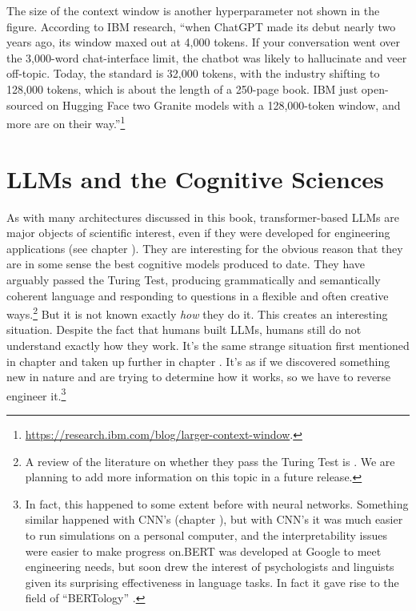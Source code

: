The size of the context window is another hyperparameter not shown in the
figure. According to IBM research, ``when ChatGPT made its debut nearly two
years ago, its window maxed out at 4,000 tokens. If your conversation went over
the 3,000-word chat-interface limit, the chatbot was likely to hallucinate and
veer off-topic. Today, the standard is 32,000 tokens, with the industry
shifting to 128,000 tokens, which is about the length of a 250-page book. IBM
just open-sourced on Hugging Face two Granite models with a 128,000-token
window, and more are on their
way.''\footnote{\url{https://research.ibm.com/blog/larger-context-window}.}

\section{LLMs and the Cognitive Sciences}\label{llm_cogsci}

As with many architectures discussed in this book, transformer-based LLMs are
major objects of scientific interest, even if they were developed for
engineering applications (see chapter ). They are
interesting for the obvious reason that they are in some sense the best
cognitive models produced to date. They have arguably passed the Turing Test,
producing grammatically and semantically coherent language and responding to
questions in a flexible and often creative ways.\footnote{A review of the
literature on whether they pass the Turing Test is \cite{jones2024does}. We are
planning to add more information on this topic in a future release.} But it is
not known exactly \emph{how} they do it. This creates an interesting situation.
Despite the fact that humans built LLMs, humans still do not understand exactly
how they work. It's the same strange situation first mentioned in chapter
 and taken up further in chapter
. It's as if we discovered something new in nature and
are trying to determine how it works, so we have to  reverse engineer
it.\footnote{In fact, this happened  to some extent before with neural
networks. Something similar happened with CNN's (chapter ), but
with CNN's it was much easier to  run simulations on a personal computer, and
the interpretability issues were easier to make progress on.BERT was developed
at Google to meet engineering needs, but soon drew the interest of
psychologists and linguists given its surprising effectiveness in language
tasks. In fact it gave rise to the field of  ``BERTology''
\cite{rogers2020primer}.}

